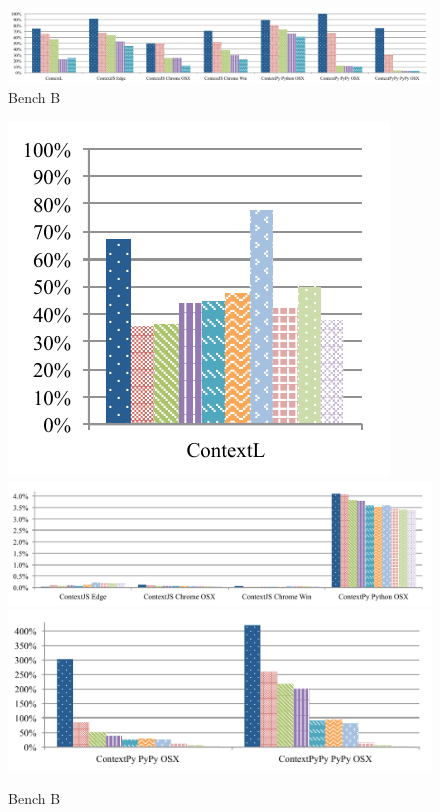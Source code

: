 \documentclass[preprint,english,10pt,nonatbib]{sigplanconf}
\begin{document}
\begin{figure}[htb]
  \centering
  \includegraphics[width=\linewidth]{bench/malte-b}
  \caption{Bench B}
\end{figure}
\begin{figure}[htb]
  \centering
  \includegraphics[height=5.5\baselineskip]{bench/malte-a/malte-a-3}
  \includegraphics[height=5.5\baselineskip]{bench/malte-a/malte-a-2}
  \includegraphics[height=5.5\baselineskip]{bench/malte-a/malte-a-4}
  \caption{Bench B}
\end{figure}
\end{document}
